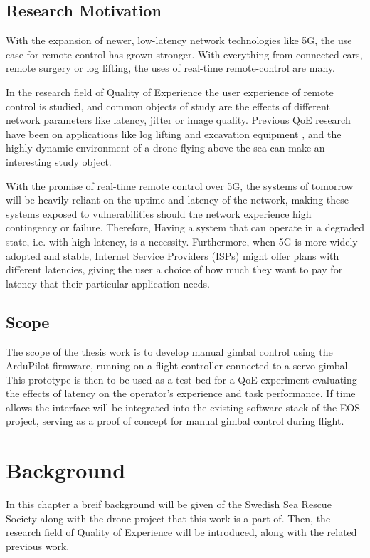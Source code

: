\documentclass[nofilelist]{cslthse-msc}
\begin{document}
\section{Research Motivation}
With the expansion of newer, low-latency network technologies like 5G, the use case for remote control has grown stronger. With everything from connected cars, remote surgery or log lifting, the uses of real-time remote-control are many.  

In the research field of Quality of Experience the user experience of remote control is studied, and common objects of study are the effects of different network parameters like latency, jitter or image quality. Previous QoE research have been on applications like log lifting \cite{industry4.0} and excavation equipment \cite{latency-impact}, and the highly dynamic environment of a drone flying above the sea can make an interesting study object.

With the promise of real-time remote control over 5G, the systems of tomorrow will be heavily reliant on the uptime and latency of the network, making these systems exposed to vulnerabilities should the network experience high contingency or failure. Therefore, Having a system that can operate in a degraded state, i.e. with high latency, is a necessity. Furthermore, when 5G is more widely adopted and stable, Internet Service Providers (ISPs) might offer plans with different latencies, giving the user a choice of how much they want to pay for latency that their particular application needs.  

\section{Scope}
The scope of the thesis work is to develop manual gimbal control using the ArduPilot firmware, running on a flight controller connected to a servo gimbal. This prototype is then to be used as a test bed for a QoE experiment evaluating the effects of latency on the operator's experience and task performance. If time allows the interface will be integrated into the existing software stack of the EOS project, serving as a proof of concept for manual gimbal control during flight.

\chapter{Background}
In this chapter a breif background will be given of the Swedish Sea Rescue Society along with the drone project that this work is a part of. Then, the research field of Quality of Experience will be introduced, along with the related previous work.
\end{document}

